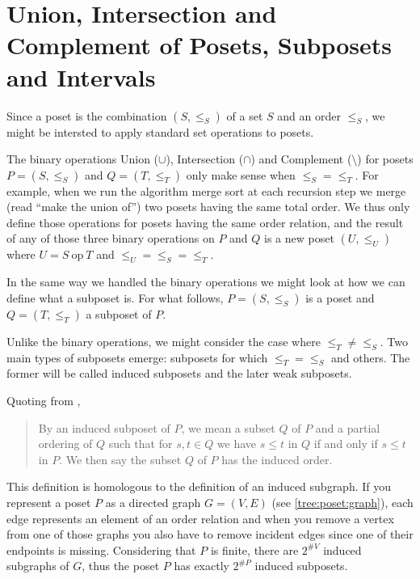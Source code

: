 \section{Union, Intersection and Complement of Posets, Subposets and Intervals}

Since a poset is the combination $(S, \le_S)$ of a set $S$ and an order $\le_S$, we might be intersted to apply standard set operations to posets.

The binary operations Union ($\cup$), Intersection ($\cap$) and Complement ($\setminus$) for posets $P = (S, \le_S)$ and $Q = (T, \le_T)$ only make sense when $\le_S = \le_T$. For example, when we run the algorithm merge sort at each recursion step we merge (read ``make the union of'') two posets having the same total order. We thus only define those operations for posets having the same order relation, and the result of any of those three binary operations on $P$ and $Q$ is a new poset $(U, \le_U)$ where $U = S~\text{op}~T$ and $\le_U = \le_S = \le_T$.


In the same way we handled the binary operations we might look at how we can define what a subposet is. For what follows, $P = (S, \le_S)$ is a poset and $Q = (T, \le_T)$ a subposet of $P$.

Unlike the binary operations, we might consider the case where $\le_T \neq \le_S$. Two main types of subposets emerge: subposets for which $\le_T = \le_S$ and others. The former will be called induced subposets and the later weak subposets.

Quoting from \cite{Stanley:2011:ECV:2124415},

\begin{quotation}

By an induced subposet of $P$, we mean a subset $Q$ of $P$ and a partial ordering of $Q$ such that for $s, t \in Q$ we have $s \leq t$ in $Q$ if and only if $s \leq t$ in $P$. We then say the subset $Q$ of $P$ has the induced order.

\end{quotation}

This definition is homologous to the definition of an induced subgraph. If you represent a poset $P$ as a directed graph $G = (V, E)$ (see \ref{tree:poset:graph}), each edge represents an element of an order relation and when you remove a vertex from one of those graphs you also have to remove incident edges since one of their endpoints is missing. Considering that $P$ is finite, there are $2^{\#V}$ induced subgraphs of $G$, thus the poset $P$ has exactly $2^{\#P}$ induced subposets.

